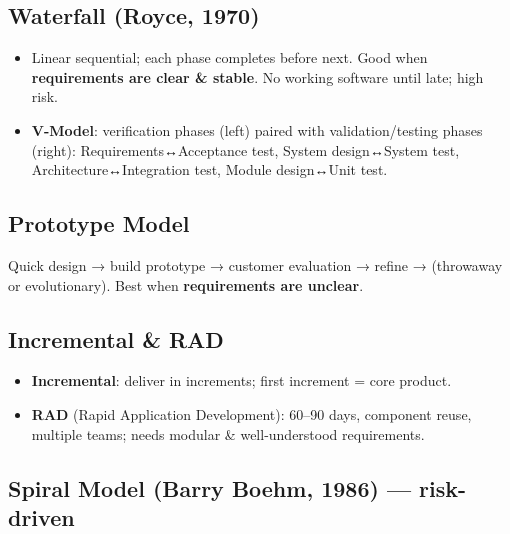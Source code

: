 \needspace{95pt}

\hypertarget{p2-06--11-waterfall-royce-1970}{%
\subsection{Waterfall (Royce, 1970)}\label{p2-06--11-waterfall-royce-1970}}



\begin{itemize}
\tightlist
\item
  Linear sequential; each phase completes before next. Good when \textbf{requirements are clear \& stable}. No working software until late; high risk.
\item
  \textbf{V-Model}: verification phases (left) paired with validation/testing phases (right): Requirements↔Acceptance test, System design↔System test, Architecture↔Integration test, Module design↔Unit test.
\end{itemize}



\needspace{161pt}

\hypertarget{p2-06--12-prototype-model}{%
\subsection{Prototype Model}\label{p2-06--12-prototype-model}}

Quick design → build prototype → customer evaluation → refine → (throwaway or evolutionary). Best when \textbf{requirements are unclear}.

\needspace{95pt}

\hypertarget{p2-06--13-incremental--rad}{%
\subsection{Incremental \& RAD}\label{p2-06--13-incremental--rad}}

\begin{itemize}
\tightlist
\item
  \textbf{Incremental}: deliver in increments; first increment = core product.
\item
  \textbf{RAD} (Rapid Application Development): 60--90 days, component reuse, multiple teams; needs modular \& well-understood requirements.
\end{itemize}

\needspace{95pt}

\hypertarget{p2-06--14-spiral-model-barry-boehm-1986--risk-driven}{%
\subsection{\texorpdfstring{Spiral Model (Barry Boehm, 1986) --- \textbf{risk-driven}}{Spiral Model (Barry Boehm, 1986) --- risk-driven}}\label{p2-06--14-spiral-model-barry-boehm-1986--risk-driven}}

